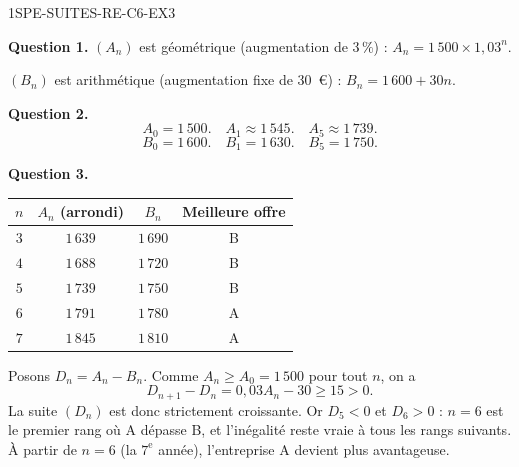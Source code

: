 \begin{corrige}{1SPE-SUITES-RE-C6-EX3}

\textbf{Question 1.} $(A_n)$ est géométrique (augmentation de $3\,\%$) : $A_n = 1\,500 \times 1{,}03^n$.

$(B_n)$ est arithmétique (augmentation fixe de $30$~€) : $B_n = 1\,600 + 30n$.

\textbf{Question 2.}
\[
A_0 = 1\,500. \quad A_1 \approx 1\,545. \quad A_5 \approx 1\,739.
\]
\[
B_0 = 1\,600. \quad B_1 = 1\,630. \quad B_5 = 1\,750.
\]

\textbf{Question 3.}

\begin{center}
\begin{tabular}{|c|c|c|c|}
\hline
$n$ & $A_n$ (arrondi) & $B_n$ & Meilleure offre \\
\hline
$3$ & $1\,639$ & $1\,690$ & B \\
$4$ & $1\,688$ & $1\,720$ & B \\
$5$ & $1\,739$ & $1\,750$ & B \\
$6$ & $1\,791$ & $1\,780$ & A \\
$7$ & $1\,845$ & $1\,810$ & A \\
\hline
\end{tabular}
\end{center}

Posons $D_n=A_n-B_n$. Comme $A_n\geq A_0=1\,500$ pour tout $n$, on a
\[
D_{n+1}-D_n=0{,}03A_n-30\geq 15>0.
\]
La suite $(D_n)$ est donc strictement croissante. Or $D_5<0$ et $D_6>0$ :
$n=6$ est le premier rang où A dépasse B, et l'inégalité reste vraie à tous
les rangs suivants. À partir de $n = 6$ (la $7^{\text{e}}$ année),
l'entreprise A devient plus avantageuse.

\end{corrige}
